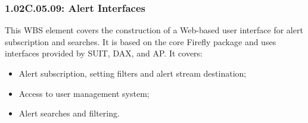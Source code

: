 \subsubsection*{1.02C.05.09: Alert Interfaces}
This WBS element covers the construction of a Web-based user interface for alert subscription and searches. It is based on the core Firefly package and uses interfaces provided by SUIT, DAX, and AP. It covers:

\begin{itemize}

\item{Alert subscription, setting filters and alert stream destination;}
\item{Access to user management system;}
\item{Alert searches and filtering.}
\end{itemize}

